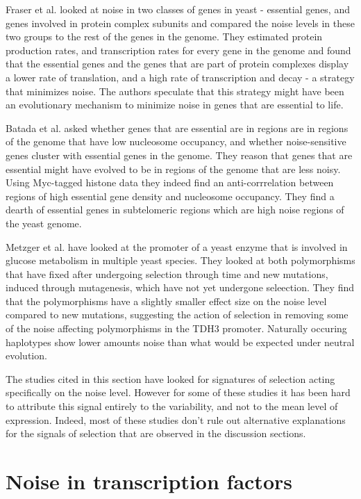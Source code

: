 Fraser et al. \cite{Fraser} looked at noise in two classes of genes in yeast - essential genes, and genes involved in protein complex subunits and compared the noise levels in these two groups to the rest of the genes in the genome. They estimated protein production rates, and transcription rates for every gene in the genome and found that the essential genes and the genes that are part of protein complexes display a lower rate of translation, and a high rate of transcription and decay - a strategy that minimizes noise. The authors speculate that this strategy might have been an evolutionary mechanism to minimize noise in genes that are essential to life.

Batada et al. \cite{Batada} asked whether genes that are essential are in regions are in regions of the genome that have low nucleosome occupancy, and whether noise-sensitive genes cluster with essential genes in the genome. They reason that genes that are essential might have evolved to be in regions of the genome that are less noisy. Using Myc-tagged histone data they indeed find an anti-corrrelation between regions of high essential gene density and nucleosome occupancy. They find a dearth of essential genes in subtelomeric regions which are high noise regions of the yeast genome.

Metzger et al. \cite{Metzger} have looked at the promoter of a yeast enzyme that is involved in glucose metabolism in multiple yeast species. They looked at both polymorphisms that have fixed after undergoing selection through time and new mutations, induced through mutagenesis, which have not yet undergone seleection. They find that the polymorphisms have a slightly smaller effect size on the noise level compared to new mutations, suggesting the action of selection in removing some of the noise affecting polymorphisms in the TDH3 promoter. Naturally occuring haplotypes show lower amounts noise than what would be expected under neutral evolution.

The studies cited in this section have looked for signatures of selection acting specifically on the noise level. However for some of these studies it has been hard to attribute this signal entirely to the variability, and not to the mean level of expression. Indeed, most of these studies don't rule out alternative explanations for the signals of selection that are observed in the discussion sections.

\section{Noise in transcription factors}

